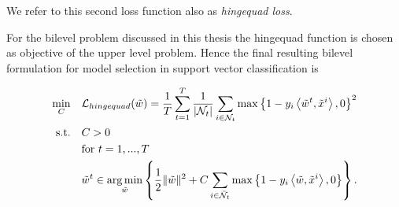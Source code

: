 We refer to this second loss function also as \emph{hingequad loss}.



For the bilevel problem discussed in this thesis the hingequad function is chosen as objective of the upper level problem.
Hence the final resulting bilevel formulation for model selection in support vector classification is 

%

\begin{align}
\begin{split}
	\min_{C} \quad &  \mathcal{L}_{hingequad}(\tilde{w}) = \frac{1}{T}\sum_{t=1}^T\frac{1}{|\mathcal{N}_t|}\sum_{i \in \mathcal{N}_t}{\max\left\{1-y_i\left\langle \tilde{w}^t,\tilde{x}^i\right\rangle,0\right\}^2}\\
	\text{s.t.} \quad & C > 0 \\
	& \text{for } t = 1,...,T \\
	& \tilde{w}^t \in \operatorname*{arg\,min}_{\tilde{w}}\left\{ \frac{1}{2} \|\tilde{w}\|^2+C\sum_{i\in \bar{\mathcal{N}}_t}\max\left\{1-y_i\left\langle \tilde{w},\tilde{x}^i\right\rangle,0\right\}\right\}. \\
\end{split}
\label{model}
\end{align}


